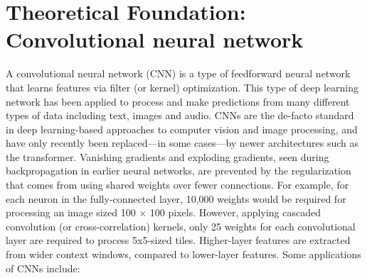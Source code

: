 \documentclass[12pt,a4paper]{report}
\begin{document}
\section{Theoretical Foundation: Convolutional neural network}
A convolutional neural network (CNN) is a type of feedforward neural network that learns features via filter (or kernel) optimization. This type of deep learning network has been applied to process and make predictions from many different types of data including text, images and audio. CNNs are the de-facto standard in deep learning-based approaches to computer vision and image processing, and have only recently been replaced—in some cases—by newer architectures such as the transformer.
Vanishing gradients and exploding gradients, seen during backpropagation in earlier neural networks, are prevented by the regularization that comes from using shared weights over fewer connections. For example, for each neuron in the fully-connected layer, 10,000 weights would be required for processing an image sized 100 × 100 pixels. However, applying cascaded convolution (or cross-correlation) kernels, only 25 weights for each convolutional layer are required to process 5x5-sized tiles. Higher-layer features are extracted from wider context windows, compared to lower-layer features.
Some applications of CNNs include: 
\end{document}
